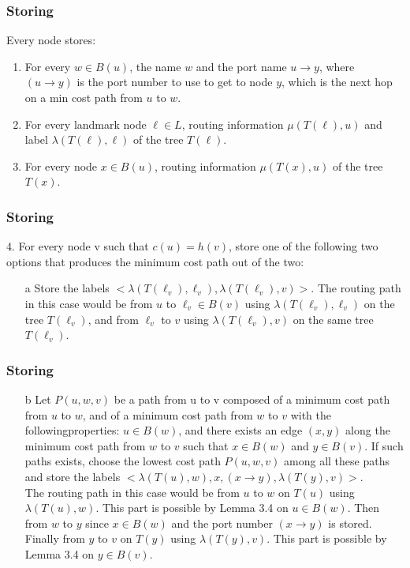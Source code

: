 \documentclass[10pt, compress]{beamer}
\begin{document}
\begin{frame}[fragile]
  \frametitle{Storing}

  Every node stores:
  \begin{enumerate}
    \item For every $w\in B(u)$, the name $w$ and the port name $u\rightarrow y$, where $(u\rightarrow y)$ is the port number to use to get to node $y$, which is the next hop on a min cost path from $u$ to $w$.
    \item For every landmark node $\ell \in L$, routing information $\mu(T(\ell),u)$ and label $\lambda(T(\ell),\ell)$ of the tree $T(\ell)$.
    \item For every node $x\in B(u)$, routing information $\mu(T(x),u)$ of the tree $T(x)$.
\end{enumerate}


\end{frame}

\begin{frame}[fragile]
  \frametitle{Storing}
    4. For every node v such that $c(u) = h(v)$, store one of the following two options that produces the minimum cost path out of the two:

    \begin{enumerate}
    \item[a] Store the labels $<\lambda(T (\ell_v), \ell_v ), \lambda(T (\ell_v), v)>$. The routing path in this case would be from $u$ to $\ell_v \in B(v)$ using $\lambda(T (\ell_v), \ell_v)$ on the tree $T (\ell_v)$, and from $\ell_v$ to $v$ using $\lambda(T (\ell_v), v)$ on the same tree $T (\ell_v)$.
    \end{enumerate}


\end{frame}

\begin{frame}[fragile]
  \frametitle{Storing}
    \begin{enumerate}
    \item[b] Let $P(u, w, v)$ be a path from u to v composed of a minimum cost path from $u$ to $w$, and of a minimum cost path from $w$ to $v$ with the followingproperties: $u \in B(w)$, and there exists an edge $(x, y)$ along the minimum cost path from $w$ to $v$ such that $x \in B(w)$ and $y \in B(v)$. If such paths exists, choose the lowest cost path $P(u, w, v)$ among all these paths and store the labels $<\lambda(T (u), w), x, (x → y), \lambda(T (y), v)>$.\\
    The routing path in this case would be from $u$ to $w$ on $T(u)$ using $\lambda(T (u), w)$. This part is possible by Lemma 3.4 on $u \in B(w)$. Then from $w$ to $y$ since $x \in B(w)$ and the port number $(x \rightarrow y)$ is stored. Finally from $y$ to $v$ on $T(y)$ using $\lambda(T (y), v)$. This part is possible by Lemma 3.4   on $y \in B(v)$.
    \end{enumerate}

\end{frame}
\end{document}
